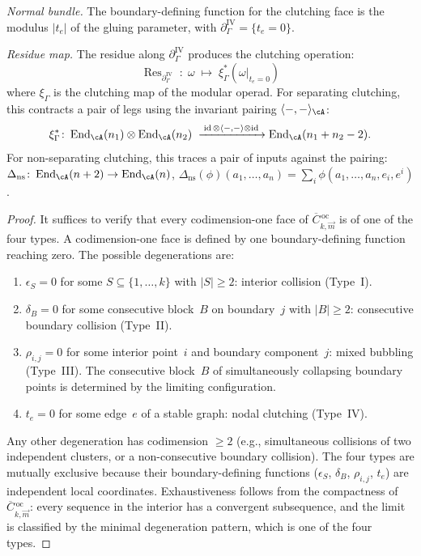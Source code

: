 \begin{proposition}
\emph{Normal bundle.}
The boundary-defining function for the clutching face is the
modulus $|t_e|$ of the gluing parameter, with
$\partial_\Gamma^{\mathrm{IV}} = \{t_e = 0\}$.

\emph{Residue map.}
The residue along $\partial_\Gamma^{\mathrm{IV}}$ produces the
clutching operation:
\begin{equation}\label{eq:typeIV-residue}
\operatorname{Res}_{\partial_\Gamma^{\mathrm{IV}}}
\;\colon\;
\omega \;\longmapsto\;
\xi_\Gamma^*(\omega|_{t_e = 0})
\end{equation}
where $\xi_\Gamma$ is the clutching map of the modular operad.
For separating clutching, this contracts a pair of legs
using the invariant pairing $\langle -, - \rangle_\cA$:
\[
\xi_\Gamma^*\colon
\operatorname{End}_\cA(n_1) \otimes \operatorname{End}_\cA(n_2)
\;\xrightarrow{\;\operatorname{id} \otimes \langle -,-\rangle
\otimes \operatorname{id}\;}
\operatorname{End}_\cA(n_1 + n_2 - 2).
\]
For non-separating clutching, this traces a pair of inputs
against the pairing:
$\Delta_{\mathrm{ns}} \colon
\operatorname{End}_\cA(n+2) \to \operatorname{End}_\cA(n)$,
$\Delta_{\mathrm{ns}}(\phi)(a_1, \ldots, a_n)
= \sum_i \phi(a_1, \ldots, a_n, e_i, e^i)$.
\end{proposition}

\begin{proof}
It suffices to verify that every codimension-one face of
$\overline{C}{}^{\,\mathrm{oc}}_{k,\vec{m}}$ is of one of the
four types.  A codimension-one face is defined by one
boundary-defining function reaching zero.  The possible
degenerations are:
\begin{enumerate}
\item $\epsilon_S = 0$ for some $S \subseteq \{1, \ldots, k\}$
  with $|S| \geq 2$: interior collision (Type~I).
\item $\delta_B = 0$ for some consecutive block~$B$ on
  boundary~$j$ with $|B| \geq 2$: consecutive boundary collision
  (Type~II).
\item $\rho_{i,j} = 0$ for some interior point~$i$ and
  boundary component~$j$: mixed bubbling (Type~III).  The
  consecutive block~$B$ of simultaneously collapsing boundary
  points is determined by the limiting configuration.
\item $t_e = 0$ for some edge~$e$ of a stable graph: nodal
  clutching (Type~IV).
\end{enumerate}
Any other degeneration has codimension $\geq 2$ (e.g.,
simultaneous collisions of two independent clusters, or a
non-consecutive boundary collision).  The four types are
mutually exclusive because their boundary-defining functions
($\epsilon_S$, $\delta_B$, $\rho_{i,j}$, $t_e$) are
independent local coordinates.  Exhaustiveness follows from
the compactness of
$\overline{C}{}^{\,\mathrm{oc}}_{k,\vec{m}}$: every sequence
in the interior has a convergent subsequence, and the limit
is classified by the minimal degeneration pattern, which is
one of the four types.
\end{proof}

